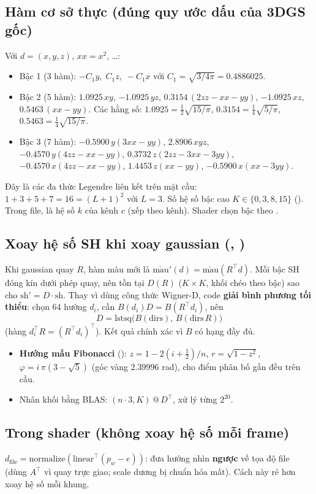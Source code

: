 \subsection{Hàm cơ sở thực (đúng quy ước dấu của 3DGS gốc)}
Với $d=(x,y,z)$, $xx=x^2$, \ldots:
\begin{itemize}
\item Bậc 1 (3 hàm): $-C_1y,\; C_1z,\; -C_1x$ với $C_1=\sqrt{3/4\pi}=0.4886025$.
\item Bậc 2 (5 hàm): $1.0925\,xy$, $-1.0925\,yz$, $0.3154\,(2zz-xx-yy)$, $-1.0925\,xz$, $0.5463\,(xx-yy)$. Các hằng số: $1.0925=\tfrac12\sqrt{15/\pi}$, $0.3154=\tfrac14\sqrt{5/\pi}$, $0.5463=\tfrac14\sqrt{15/\pi}$.
\item Bậc 3 (7 hàm): $-0.5900\,y(3xx-yy)$, $2.8906\,xyz$, $-0.4570\,y(4zz-xx-yy)$, $0.3732\,z(2zz-3xx-3yy)$, $-0.4570\,x(4zz-xx-yy)$, $1.4453\,z(xx-yy)$, $-0.5900\,x(xx-3yy)$.
\end{itemize}
Đây là các đa thức Legendre liên kết trên mặt cầu: $1+3+5+7=16=(L+1)^2$ với $L=3$. Số hệ số bậc cao $K\in\{0,3,8,15\}$ (). Trong file,  là hệ số $k$ của kênh $c$ (xếp theo kênh). Shader chọn bậc theo .

\subsection{Xoay hệ số SH khi xoay gaussian (, )}\label{s:shrot}
Khi gaussian quay $R$, hàm màu mới là $\mathrm{m\grave{a}u}'(d)=\mathrm{m\grave{a}u}(R^{\top}d)$. Mỗi bậc SH đóng kín dưới phép quay, nên tồn tại $D(R)$ ($K\times K$, khối chéo theo bậc) sao cho $\mathrm{sh}'=D\cdot\mathrm{sh}$. Thay vì dùng công thức Wigner-D, code \textbf{giải bình phương tối thiểu}: chọn 64 hướng $d_i$, cần $B(d_i)D=B(R^{\top}d_i)$, nên
\[
D=\mathrm{lstsq}\big(B(\mathrm{dirs}),\,B(\mathrm{dirs}\,R)\big)
\]
(hàng $d_i^{\top}R=(R^{\top}d_i)^{\top}$). Kết quả chính xác vì $B$ có hạng đầy đủ.
\begin{itemize}
\item \textbf{Hướng mẫu Fibonacci} (): $z=1-2(i+\tfrac12)/n$, $r=\sqrt{1-z^2}$, $\varphi=i\,\pi(3-\sqrt5)$ (góc vàng $2.39996$ rad), cho điểm phân bố gần đều trên cầu.
\item Nhân khối bằng BLAS: $(n\cdot3,K)\,@\,D^{\top}$, xử lý từng  $2^{20}$.
\end{itemize}

\subsection{Trong shader (không xoay hệ số mỗi frame)}
$d_{\mathrm{file}}=\mathrm{normalize}(\mathrm{linear}^{\top}(p_w-e))$: đưa hướng nhìn \textbf{ngược} về tọa độ file (dùng $A^{\top}$ vì quay trực giao; scale dương bị chuẩn hóa mất). Cách này rẻ hơn xoay hệ số mỗi khung.

